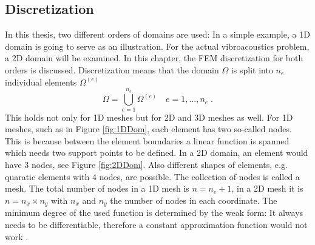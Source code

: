 \documentclass[%
  a4paper,oneside,%
  11pt,%
  smallchapters,
  style=printdev,
  extramargin,
  green,%
  rgb, <cmyk>
  ]{tubsbook}
\begin{document}
\subsection{Discretization}
In this thesis, two different orders of domains are used: In a simple example, a 1D domain is going to serve as an illustration. For the actual vibroacoustics problem, a 2D domain will be examined. In this chapter, the FEM discretization for both orders is discussed.
%
Discretization means that the domain $\Omega$ is split into $n_e$ individual elements $\Omega^{(e)}$
\begin{equation}
\Omega = \bigcup_{e=1}^{n_e} \Omega^{(e)} \quad e = 1,...,n_e \;.
\end{equation}
This holds not only for 1D meshes but for 2D and 3D meshes as well.
For 1D meshes, such as in Figure \ref{fig:1DDom}, each element has two so-called nodes. This is because between the element boundaries a linear function is spanned which needs two support points to be defined.  In a 2D domain, an element would have 3 nodes, see Figure \ref{fig:2DDom}. Also different shapes of elements, e.g. quaratic elements with 4 nodes, are possible. The collection of nodes is called a mesh. The total number of nodes in a 1D mesh is $n = n_e + 1$, in a 2D mesh it is $n = n_x \times n_y$ with $n_x$ and $n_y$ the number of nodes in each coordinate. The minimum degree of the used function is determined by the weak form: It always needs to be differentiable, therefore a constant approximation function would not work \cite{atalla2015}. 
\end{document}
